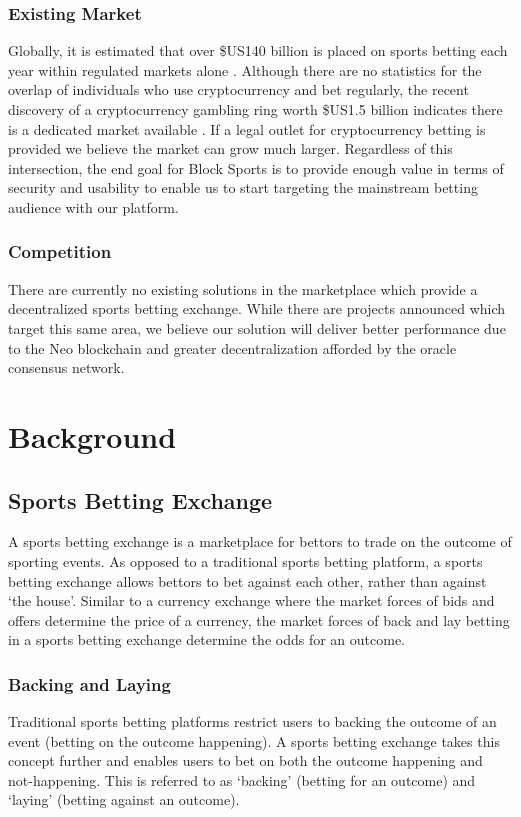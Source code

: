 \documentclass{article}
\begin{document}
		\subsubsection{Existing Market} \label{existing-market}
Globally, it is estimated that over \$US140 billion is placed on sports betting each year within regulated markets alone \cite{betting-stats}. Although there are no statistics for the overlap of individuals who use cryptocurrency and bet regularly, the recent discovery of a cryptocurrency gambling ring worth \$US1.5 billion indicates there is a dedicated market available \cite{gambling-ring}. If a legal outlet for cryptocurrency betting is provided we believe the market can grow much larger. Regardless of this intersection, the end goal for Block Sports is to provide enough value in terms of security and usability to enable us to start targeting the mainstream betting audience with our platform.

		\subsubsection{Competition} \label{competition}
There are currently no existing solutions in the marketplace which provide a decentralized sports betting exchange. While there are projects announced which target this same area, we believe our solution will deliver better performance due to the Neo blockchain and greater decentralization afforded by the oracle consensus network.

\pagebreak

\section{Background} \label{background}

	\subsection{Sports Betting Exchange} \label{sports-betting-exchange}
A sports betting exchange is a marketplace for bettors to trade on the outcome of sporting events. As opposed to a traditional sports betting platform, a sports betting exchange allows bettors to bet against each other, rather than against ‘the house’. Similar to a currency exchange where the market forces of bids and offers determine the price of a currency, the market forces of back and lay betting in a sports betting exchange determine the odds for an outcome.

		\subsubsection{Backing and Laying} \label{backing-and-laying}
Traditional sports betting platforms restrict users to backing the outcome of an event (betting on the outcome happening). A sports betting exchange takes this concept further and enables users to bet on both the outcome happening and not-happening. This is referred to as ‘backing’ (betting for an outcome) and ‘laying’ (betting against an outcome).
\end{document}
